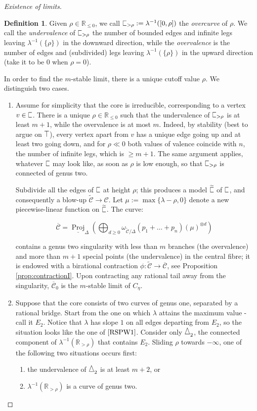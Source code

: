 \documentclass{compositio}
\newcommand{\tropC}{\scalebox{0.8}[1.3]{$\sqsubset$}}
\newcommand{\ttropC}{\widetilde{\tropC}}
\newcommand{\tropT}{\scalebox{0.9}[1.2]{$\top$}}
\newcommand{\tropD}{\scalebox{0.9}[1.3]{$\triangle$}}
\renewcommand{\to}{\rightarrow}
\newcommand{\tC}{\widetilde{\mathcal C}}
\newcommand{\cC}{\mathcal C}
\newcommand{\oC}{\overline{\mathcal C}}
\newcommand{\dvr}{\Delta}
\theoremstyle{plain}
\theoremstyle{definition}
\newtheorem{definition}[thm]{Definition}
\theoremstyle{remark}
\begin{document}
\begin{proof}[Existence of limits]
\begin{definition}
 Given $\rho\in\mathbb R_{\leq0}$, we call $\tropC_{>\rho}:=\lambda^{-1}([0,\rho])$ the \emph{overcurve} of $\rho$. We call the \emph{undervalence} of $\tropC_{>\rho}$ the number of bounded edges and infinite legs leaving $\lambda^{-1}(\{\rho\})$ in the downward direction, while the \emph{overvalence} is the number of edges and (subdivided) legs leaving $\lambda^{-1}(\{\rho\})$ in the upward direction (take it to be $0$ when $\rho=0$).
\end{definition}

In order to find the $m$-stable limit, there is a unique cutoff value $\rho$. We distinguish two cases.
\begin{enumerate}
 \item\label{pt:contraction2} Assume for simplicity that the core is irreducible, corresponding to a vertex $v\in\tropC$. There is a unique $\rho\in\mathbb R_{\leq 0}$ such that the undervalence of $\tropC_{>\rho}$ is at least $m+1$, while the overvalence is at most $m$. Indeed, by stability (best to argue on $\tropT$), every vertex apart from $v$ has a unique edge going up and at least two going down, and for $\rho\ll0$ both values of valence coincide with $n$, the number of infinite legs, which is $\geq m+1$. The same argument applies, whatever $\tropC$ may look like, as soon as $\rho$ is low enough, so that $\tropC_{>\rho}$ is connected of genus two.
 
 Subdivide all the edges of $\tropC$ at height $\rho$; this produces a model $\ttropC$ of $\tropC$, and consequently a blow-up $\tC\to\cC$. Let $\mu:=\max\{\lambda-\rho,0\}$ denote a new piecewise-linear function on $\ttropC$. The curve:
 
 \[\oC=\underline{\operatorname{Proj}}_\dvr\left(\bigoplus_{d\geq 0}\omega_{\tC/\dvr}(p_1+\ldots+p_n)(\mu)^{\otimes d}\right)\]
 
 contains a genus two singularity with less than $m$ branches (the overvalence) and more than $m+1$ special points (the undervalence) in the central fibre; it is endowed with a birational contraction $\phi\colon\tC\to\oC$, see Proposition \ref{prop:contractionI}. Upon contracting any rational tail away from the singularity, $\oC_0$ is the $m$-stable limit of $C_\eta$.

 \item Suppose that the core consists of two curves of genus one, separated by a rational bridge. Start from the one on which $\lambda$ attains the maximum value - call it $E_2$. Notice that $\lambda$ has slope $1$ on all edges departing from $E_2$, so the situation looks like the one of $\cite{RSPW1}$. Consider only $\tropD_2$, the connected component of $\lambda^{-1}(\mathbb R_{>\rho})$ that contains $E_2$. Sliding $\rho$ towards $-\infty$, one of the following two situations occurs first:
 \begin{enumerate}
 \item the undervalence of $\tropD_2$ is at least $m+2$, or
 \item $\lambda^{-1}(\mathbb R_{>\rho})$ is a curve of genus two.
 \end{enumerate}
 

\end{enumerate}
\end{proof}
\end{document}
